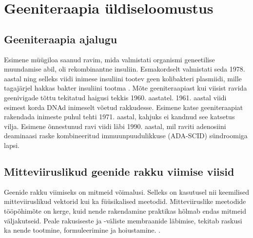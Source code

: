 \documentclass{trkut}%
\begin{document}
\section{Geeniteraapia üldiseloomustus}

\subsection{Geeniteraapia ajalugu}

Esimene müügiloa saanud ravim, mida valmistati organismi geneetilise muundamise abil, oli rekombinantne insuliin. Esmakordselt valmistati seda 1978. aastal ning selleks viidi inimese insuliini tootev geen kolibakteri plasmiidi, mille tagajärjel hakkas bakter insuliini tootma \parencite{insuliin}. Mõte geeniteraapiast kui viisist ravida geenivigade tõttu tekitatud haigusi tekkis 1960. aastatel. 1961. aastal viidi esimest korda DNAd inimeselt võetud rakkudesse. Esimene katse geeniteraapiat rakendada inimeste puhul tehti 1971. aastal, kahjuks ei kandnud see katsetus vilja. Esimene õnnestunud ravi viidi läbi 1990. aastal, mil raviti adenosiini deaminaasi raske kombineeritud immuunpuudulikkuse (ADA-SCID) sündroomiga lapsi. \parencite{genajalugu}

\subsection{Mitteviiruslikud geenide rakku viimise viisid}

Geenide rakku viimiseks on mitmeid võimalusi. Selleks on kasutusel nii keemilised mitteviiruslikud vektorid kui ka füüsikalised meetodid. Mitteviiruslike meetodide tööpõhimõte on kerge, kuid nende rakendamine praktikas hõlmab endas mitmeid väljakutseid. Peale rakusiseste ja -väliste membraanide läbimise, tekitab raskusi ka nende tootmine, formuleerimine ja hoiustamine. \parencite{genviisid}.
\end{document}
